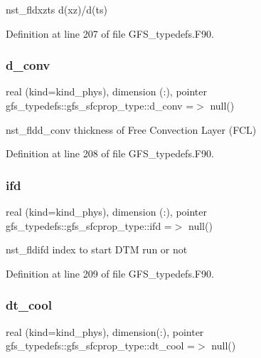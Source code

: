 nst\+\_\+fldxzts d(xz)/d(ts) 



Definition at line 207 of file G\+F\+S\+\_\+typedefs.\+F90.

\mbox{\label{structgfs__typedefs_1_1gfs__sfcprop__type_aaba0e61e6a8c068f9aa375606709e525}} 
\subsubsection{d\+\_\+conv}
{\footnotesize\ttfamily real (kind=kind\+\_\+phys), dimension (\+:), pointer gfs\+\_\+typedefs\+::gfs\+\_\+sfcprop\+\_\+type\+::d\+\_\+conv =$>$ null()}



nst\+\_\+fldd\+\_\+conv thickness of Free Convection Layer (F\+CL) 



Definition at line 208 of file G\+F\+S\+\_\+typedefs.\+F90.

\mbox{\label{structgfs__typedefs_1_1gfs__sfcprop__type_a8a1cffc31d092954b76353278ab5f8a6}} 
\subsubsection{ifd}
{\footnotesize\ttfamily real (kind=kind\+\_\+phys), dimension    (\+:), pointer gfs\+\_\+typedefs\+::gfs\+\_\+sfcprop\+\_\+type\+::ifd =$>$ null()}



nst\+\_\+fldifd index to start D\+TM run or not 



Definition at line 209 of file G\+F\+S\+\_\+typedefs.\+F90.

\mbox{\label{structgfs__typedefs_1_1gfs__sfcprop__type_acb654ca7469e7229925eb26d8ca0a2ba}} 
\subsubsection{dt\+\_\+cool}
{\footnotesize\ttfamily real (kind=kind\+\_\+phys), dimension(\+:), pointer gfs\+\_\+typedefs\+::gfs\+\_\+sfcprop\+\_\+type\+::dt\+\_\+cool =$>$ null()}



